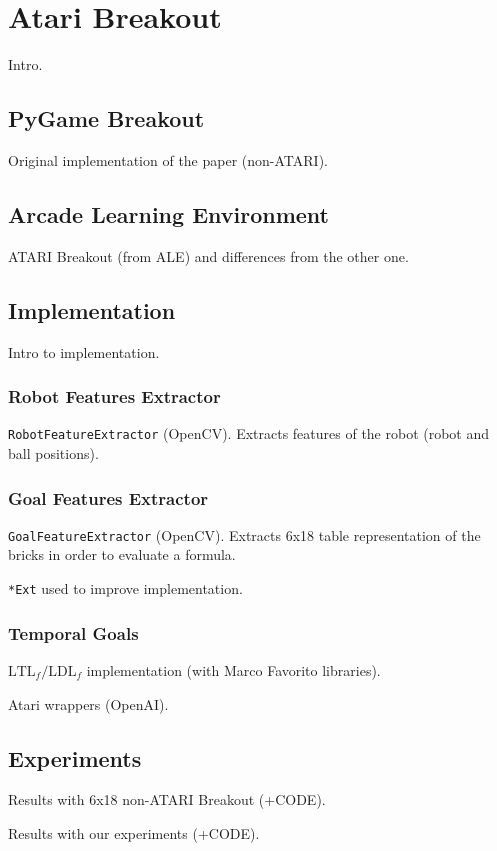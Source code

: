 \section{Atari Breakout}
Intro.

\subsection{PyGame Breakout}
Original implementation of the paper (non-ATARI).

\subsection{Arcade Learning Environment}
ATARI Breakout (from ALE) and differences from the other one.

\subsection{Implementation}
Intro to implementation.

\subsubsection{Robot Features Extractor}
\texttt{RobotFeatureExtractor} (OpenCV). Extracts features of the robot (robot
and ball positions).


\subsubsection{Goal Features Extractor}
\texttt{GoalFeatureExtractor} (OpenCV). Extracts 6x18 table representation
of the bricks in order to evaluate a formula.


\texttt{*Ext} used to improve implementation.

\subsubsection{Temporal Goals}
$\text{LTL}_f/\text{LDL}_f$ implementation (with Marco Favorito libraries).


Atari wrappers (OpenAI).

\subsection{Experiments}
\label{subsec:experiments}
Results with 6x18 non-ATARI Breakout (+CODE).

Results with our experiments (+CODE).
